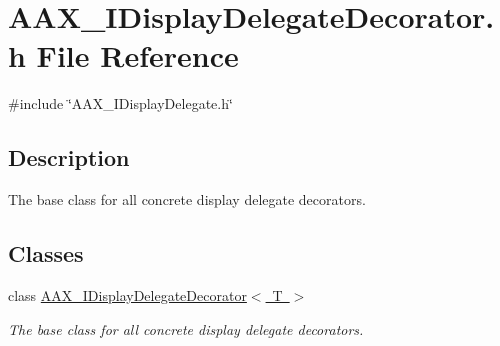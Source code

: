 \hypertarget{a00584}{}\section{A\+A\+X\+\_\+\+I\+Display\+Delegate\+Decorator.\+h File Reference}
\label{a00584}
{\ttfamily \#include \char`\"{}A\+A\+X\+\_\+\+I\+Display\+Delegate.\+h\char`\"{}}\newline


\subsection{Description}
The base class for all concrete display delegate decorators. 

\subsection*{Classes}
\begin{DoxyCompactItemize}
\item 
class \mbox{\hyperlink{a01805}{A\+A\+X\+\_\+\+I\+Display\+Delegate\+Decorator$<$ T $>$}}
\begin{DoxyCompactList}\small\item\em The base class for all concrete display delegate decorators. \end{DoxyCompactList}\end{DoxyCompactItemize}
